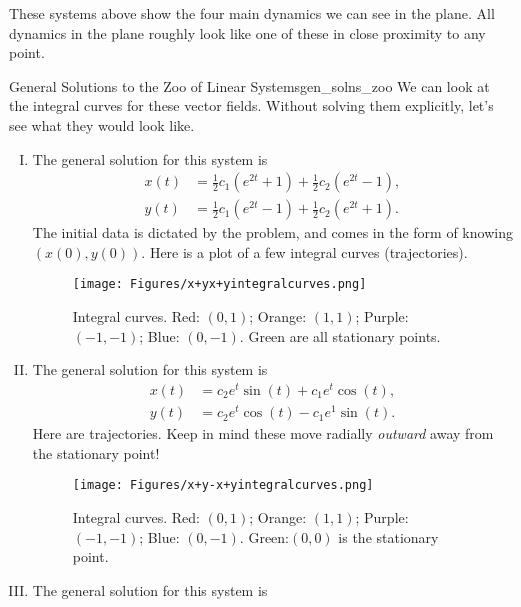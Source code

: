         These systems above show the four main dynamics we can see in the plane. All dynamics in the plane roughly look like one of these in close proximity to any point.
        
        \begin{ex}{General Solutions to the Zoo of Linear Systems}{gen_solns_zoo}
        We can look at the integral curves for these vector fields.  Without solving them explicitly, let's see what they would look like.
        \begin{enumerate}[(I)]
            \item The general solution for this system is
            \begin{align*}
                x(t)&= \frac{1}{2}c_1 \left( e^{2t}+1\right)+\frac{1}{2}c_2\left(e^{2t}-1\right),\\
                y(t)&=\frac{1}{2}c_1 \left( e^{2t}-1\right)+\frac{1}{2}c_2\left(e^{2t}+1\right).
            \end{align*}
            The initial data is dictated by the problem, and comes in the form of knowing $(x(0),y(0))$.  Here is a plot of a few integral curves (trajectories).
            \begin{figure}[H]
                \centering
                \texttt{[image: Figures/x+yx+yintegralcurves.png]}
                \caption{Integral curves. Red: $(0,1)$; Orange: $(1,1)$; Purple: $(-1,-1)$; Blue: $(0,-1)$. Green are all stationary points.}
            \end{figure}
            \item The general solution for this system is
            \begin{align*}
                x(t)&= c_2 e^t \sin(t)+c_1e^t\cos(t),\\
                y(t)&= c_2 e^t \cos(t) - c_1e^1 \sin(t).
            \end{align*}
            Here are trajectories. Keep in mind these move radially \emph{outward} away from the stationary point!
                        \begin{figure}[H]
                \centering
                \texttt{[image: Figures/x+y-x+yintegralcurves.png]}
                \caption{Integral curves. Red: $(0,1)$; Orange: $(1,1)$; Purple: $(-1,-1)$; Blue: $(0,-1)$. Green:$(0,0)$ is the stationary point.}
            \end{figure}
            \item The general solution for this system is
            \begin{align*}

\end{align*}
\end{enumerate}
\end{ex}
